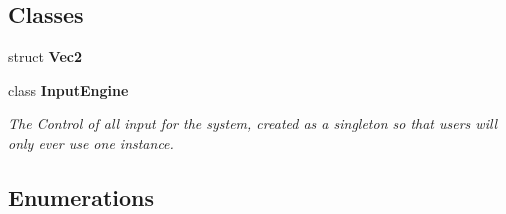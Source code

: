 \subsection*{Classes}
\begin{DoxyCompactItemize}
\item 
struct {\bf Vec2}
\item 
class {\bf Input\+Engine}
\begin{DoxyCompactList}\small\item\em The Control of all input for the system, created as a singleton so that users will only ever use one instance. \end{DoxyCompactList}\end{DoxyCompactItemize}
\subsection*{Enumerations}
